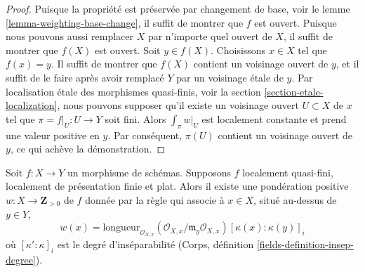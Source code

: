 \begin{proof}
Puisque la propriété est préservée par changement de base, voir le
lemme \ref{lemma-weighting-base-change}, il suffit
de montrer que $f$ est ouvert. Puisque nous pouvons aussi remplacer
$X$ par n'importe quel ouvert de $X$, il suffit de montrer que $f(X)$
est ouvert. Soit $y \in f(X)$. Choisissons $x \in X$ tel que $f(x) = y$.
Il suffit de montrer que $f(X)$ contient un voisinage ouvert
de $y$, et il suffit de le faire après avoir remplacé $Y$ par un
voisinage \'etale de $y$. Par localisation \'etale des
morphismes quasi-finis, voir la section \ref{section-etale-localization},
nous pouvons supposer
qu'il existe un voisinage ouvert $U \subset X$ de $x$
tel que $\pi = f|_U : U \to Y$ soit fini. Alors
$\int_\pi w|_U$ est localement constante et prend une valeur positive en $y$.
Par conséquent, $\pi(U)$ contient un voisinage ouvert de $y$,
ce qui achève la démonstration.
\end{proof}

\begin{lemma}
\label{lemma-weighting-flat-quasi-finite}
Soit $f : X \to Y$ un morphisme de schémas. Supposons $f$
localement quasi-fini, localement de présentation finie et plat.
Alors il existe une pondération positive $w : X \to \mathbf{Z}_{> 0}$ de $f$
donnée par la règle qui associe à $x \in X$, situé au-dessus de $y \in Y$,
$$
w(x) =
\text{longueur}_{\mathcal{O}_{X, x}}
(\mathcal{O}_{X, x}/\mathfrak m_y \mathcal{O}_{X, x})
[\kappa(x) : \kappa(y)]_i
$$
où $[\kappa' : \kappa]_i$ est le degré d'inséparabilité
(Corps, définition \ref{fields-definition-insep-degree}).
\end{lemma}

